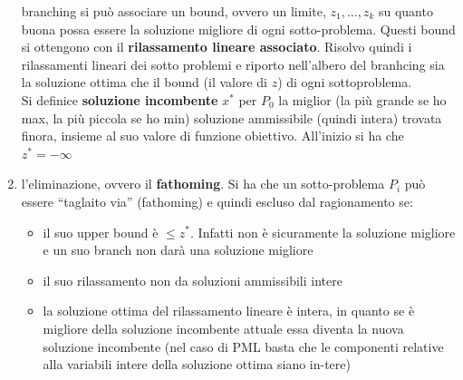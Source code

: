 \documentclass[a4paper,12pt, oneside]{book}
\begin{document}
\begin{enumerate}
  branching si può associare un bound, ovvero un limite,
  $z_1,\ldots,z_k$ su quanto buona possa essere la soluzione migliore
  di ogni sotto-problema. Questi bound si ottengono con il
  \textbf{rilassamento lineare associato}. Risolvo quindi i
  rilassamenti lineari dei sotto problemi e riporto nell'albero del
  branhcing sia la soluzione ottima che il bound (il valore di $z$) di
  ogni sottoproblema.\\
  Si definice \textbf{soluzione incombente} $x^*$ per $P_0$ la miglior (la
  più grande se ho max, la più piccola se ho min)   soluzione
  ammissibile (quindi intera) trovata finora, insieme al suo valore
  di funzione obiettivo. All'inizio si ha che $z^*=-\infty$
  \item l'eliminazione, ovvero il \textbf{fathoming}. Si ha che un
  sotto-problema $P_i$ può essere ``taglaito via'' (fathoming) e
  quindi escluso dal ragionamento se:
  \begin{itemize}
    \item il suo upper bound è $\leq z^*$. Infatti non è sicuramente
    la soluzione migliore e un suo branch non darà una soluzione
    migliore
    \item il suo rilassamento non da soluzioni ammissibili intere
    \item la soluzione ottima del rilassamento lineare è intera, in
    quanto se è migliore della soluzione incombente attuale essa
    diventa la nuova soluzione incombente (nel caso di PML basta che
    le componenti relative alla variabili intere della soluzione
    ottima siano in-tere)
  \end{itemize}
\end{enumerate}
\end{document}
